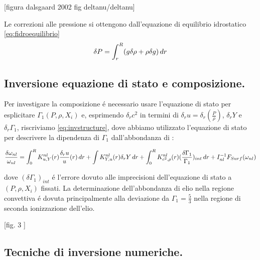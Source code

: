 \documentclass[../main.tex]{subfiles}
\begin{document}
[figura dalsgaard 2002 fig deltanu/deltanu]


Le correzioni alle pressione si ottengono dall'equazione di equilibrio idrostatico \eqref{eq:fidroequilibrio}
\begin{equation}
\delta P=\int_r^R(g\delta \rho+\rho\delta g)\,dr\label{eq:pressurecorrho}
\end{equation}


\subsection{Inversione equazione di stato e composizione.}

Per investigare la composizione \'e necessario usare l'equazione di stato per esplicitare $\Gamma_1(P,\rho,X_i)$ e, esprimendo $\delta_rc^2$ in termini di $\delta_ru=\delta_r(\frac{P}{\rho})$, $\delta_rY$ e $\delta_r\Gamma_1$, riscriviamo \eqref{eq:invstructure}, dove abbiamo utilizzato l'equazione di stato per descrivere la dipendenza di $\Gamma_1$ dall'abbondanza di :

\begin{equation}
\frac{\delta\omega_{nl}}{\omega_{nl}}=\int_0^RK^{nl}_{u,Y}(r)\frac{\delta_ru}{u}(r)\,dr+\int K^{nl}_{Y,u}(r)\delta_rY\,dr+\int_0^RK^{nl}_{c^2,\rho}(r)(\frac{\delta\Gamma_1}{\Gamma_1})_{int}\,dr+I_{nl}^{-1}F_{Surf}(\omega_{nl})\label{eq:diffthermo}
\end{equation}

dove $(\delta\Gamma_1)_{int}$ \'e l'errore dovuto alle imprecisioni dell'equazione di stato a $(P,\rho,X_i)$ fissati. La determinazione dell'abbondanza di elio nella regione convettiva \'e dovuta principalmente alla deviazione da $\Gamma_1=\frac{5}{3}$ nella regione di seconda ionizzazione dell'elio.


[fig. 3 \cite{cas99helioseismology}]

\subsection{Tecniche di inversione numeriche.}
\end{document}
